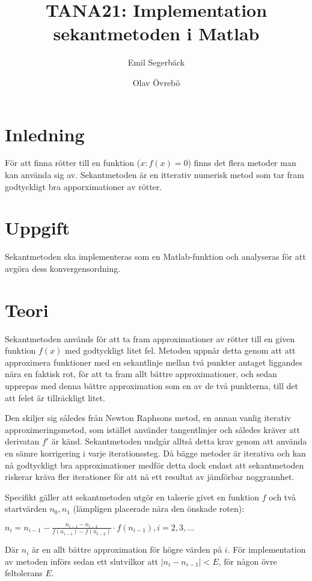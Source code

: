 \documentclass{article}
\title{TANA21: Implementation sekantmetoden i Matlab}
\author{Emil Segerbäck \and Olav Övrebö}
\begin{document}
\maketitle
\newpage

\section{Inledning}
För att finna rötter till en funktion ($x : f(x) = 0$) finns det flera metoder man kan använda sig av. Sekantmetoden är en itterativ numerisk metod som tar fram godtyckligt bra apporximationer av rötter.

\section{Uppgift}
Sekantmetoden ska implementeras som en Matlab-funktion och analyseras för att avgöra dess konvergensordning.

\section{Teori}
Sekantmetoden används för att ta fram approximationer av rötter till en given funktion $f(x)$ med godtyckligt litet fel. Metoden uppnår detta genom att att approximera funktioner med en sekantlinje mellan två punkter antaget liggandes nära en faktisk rot, för att ta fram allt bättre approximationer, och sedan upprepas med denna bättre approximation som en av de två punkterna, till det att felet är tillräckligt litet.

Den skiljer sig således från Newton Raphsons metod, en annan vanlig iterativ approximeringsmetod, som istället använder tangentlinjer och således kräver att derivatan $f'$ är känd. Sekantmetoden undgår alltså detta krav genom att använda en sämre korrigering i varje iterationssteg. Då bägge metoder är iterativa och kan nå godtyckligt bra approximationer medför detta dock endast att sekantmetoden riskerar kräva fler iterationer för att nå ett resultat av jämförbar noggrannhet.

Specifikt gäller att sekantmetoden utgör en talserie givet en funktion $f$ och två startvärden $n_{0}, n_{1}$ (lämpligen placerade nära den önskade roten): 

$ n_{i} = n_{i-1} - \frac{n_{i-1} - n_{i-2}}{f(n_{i-1}) - f(n_{i-2})} \cdot f(n_{i-1}), i = 2, 3, ...$

Där $n_{i}$ är en allt bättre approximation för högre värden på $i$. För implementation av metoden införs sedan ett slutvilkor att $|n_{i} - n_{i-1}| < E$, för någon övre feltolerans $E$.
\end{document}
